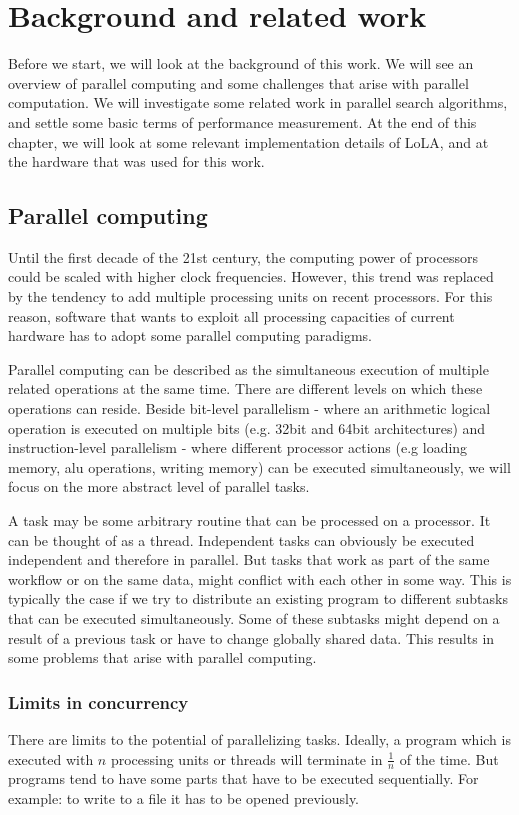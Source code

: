 \chapter{Background and related work}
Before we start, we will look at the background of this work. We will see an overview of parallel computing and some challenges that arise with parallel computation. We will investigate some related work in parallel search algorithms, and settle some basic terms of performance measurement. At the end of this chapter, we will look at some relevant implementation details of LoLA, and at the hardware that was used for this work.

\section{Parallel computing}
Until the first decade of the 21st century, the computing power of processors could be scaled with higher clock frequencies. However, this trend was replaced by the tendency to add multiple processing units on recent processors. For this reason, software that wants to exploit all processing capacities of current hardware has to adopt some parallel computing paradigms.

Parallel computing can be described as the simultaneous execution of multiple related operations at the same time. There are different levels on which these operations can reside. Beside bit-level parallelism - where an arithmetic logical operation is executed on multiple bits (e.g. 32bit and 64bit architectures) and instruction-level parallelism\cite{wall1991limits} - where different processor actions (e.g loading memory, alu operations, writing memory) can be executed simultaneously, we will focus on the more abstract level of parallel tasks.

A task may be some arbitrary routine that can be processed on a processor. It can be thought of as a thread. Independent tasks can obviously be executed independent and therefore in parallel. But tasks that work as part of the same workflow or on the same data, might conflict with each other in some way. This is typically the case if we try to distribute an existing program to different subtasks that can be executed simultaneously. Some of these subtasks might depend on a result of a previous task or have to change globally shared data. This results in some problems that arise with parallel computing.

\subsection{Limits in concurrency}
There are limits to the potential of parallelizing tasks. Ideally, a program which is executed with $n$ processing units or threads will terminate in $\frac{1}{n}$ of the time. But programs tend to have some parts that have to be executed sequentially. For example: to write to a file it has to be opened previously.

